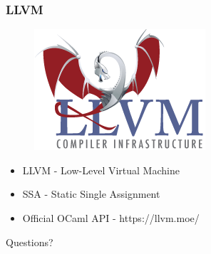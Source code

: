 \documentclass{beamer}
\begin{document}
\begin{frame}
  \frametitle{LLVM}
  \begin{figure}
    \includegraphics[scale=0.5]{LLVM-Logo-Derivative-1.png}
  \end{figure}
  \begin{itemize}
    \pause
  \item LLVM - Low-Level Virtual Machine
    \pause
  \item SSA - Static Single Assignment
    \pause
  \item Official OCaml API - https://llvm.moe/
  \end{itemize}
\end{frame}

\begin{frame}[plain,c]
  \begin{center}
    \huge Questions?
  \end{center}
\end{frame}
\end{document}
